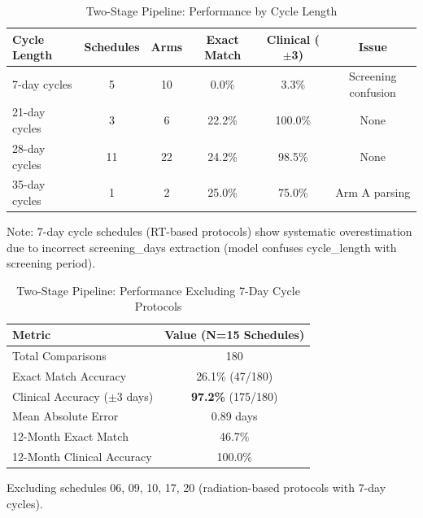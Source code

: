 
\begin{table}[htbp]
\centering
\caption{Two-Stage Pipeline: Performance by Cycle Length}
\label{tab:two_stage_cycle_length}
\begin{tabular}{lccccc}
\toprule
\textbf{Cycle Length} & \textbf{Schedules} & \textbf{Arms} & \textbf{Exact Match} & \textbf{Clinical ($\pm$3)} & \textbf{Issue} \\
\midrule
7-day cycles & 5 & 10 & 0.0\% & 3.3\% & Screening confusion \\
21-day cycles & 3 & 6 & 22.2\% & 100.0\% & None \\
28-day cycles & 11 & 22 & 24.2\% & 98.5\% & None \\
35-day cycles & 1 & 2 & 25.0\% & 75.0\% & Arm A parsing \\
\bottomrule
\end{tabular}
\begin{tablenotes}
\small
\item Note: 7-day cycle schedules (RT-based protocols) show systematic overestimation due to incorrect screening\_days extraction (model confuses cycle\_length with screening period).
\end{tablenotes}
\end{table}


\begin{table}[htbp]
\centering
\caption{Two-Stage Pipeline: Performance Excluding 7-Day Cycle Protocols}
\label{tab:two_stage_excluding_rt}
\begin{tabular}{lc}
\toprule
\textbf{Metric} & \textbf{Value (N=15 Schedules)} \\
\midrule
Total Comparisons & 180 \\
Exact Match Accuracy & 26.1\% (47/180) \\
Clinical Accuracy ($\pm$3 days) & \textbf{97.2\%} (175/180) \\
Mean Absolute Error & 0.89 days \\
\midrule
12-Month Exact Match & 46.7\% \\
12-Month Clinical Accuracy & 100.0\% \\
\bottomrule
\end{tabular}
\begin{tablenotes}
\small
\item Excluding schedules 06, 09, 10, 17, 20 (radiation-based protocols with 7-day cycles).
\end{tablenotes}
\end{table}

